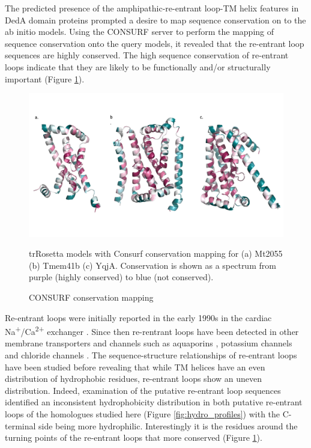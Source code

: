 The predicted presence of the amphipathic-re-entrant loop-TM helix features in DedA domain proteins prompted a desire to map sequence conservation on to the ab initio models. Using the CONSURF server to perform the mapping of sequence conservation onto the query models, it revealed that the re-entrant loop sequences are highly conserved. The high sequence conservation of re-entrant loops indicate that they are likely to be functionally and/or structurally important (Figure \ref{fig:consurf}).

\begin{figure}[th!]
    \centering
    \includegraphics[width=\textwidth]{Results/fig6.png}
    \caption{CONSURF conservation mapping}
    \label{fig:consurf}
    \small
    trRosetta models with Consurf conservation mapping for (a) Mt2055 (b) Tmem41b (c) YqjA. Conservation is shown as a spectrum from purple (highly conserved) to blue (not conserved).
\end{figure}


Re-entrant loops were initially reported in the early 1990s in the cardiac Na\textsuperscript{+}/Ca\textsuperscript{2+} exchanger \cite{iwamoto1999unique}.
Since then re-rentrant loops have been detected in other membrane transporters and channels such as aquaporins \cite{de2001refined}, potassium channels \cite{zhou2001chemistry} and chloride channels \cite{dutzler2002x}.  The sequence-structure relationships of re-entrant loops have been studied before \cite{Yan2010} revealing that while TM helices have an even distribution of hydrophobic residues, re-entrant loops show an uneven distribution. Indeed, examination of the putative re-entrant loop sequences identified an inconsistent hydrophobicity distribution in both putative re-entrant loops of the homologues studied here (Figure \ref{fig:hydro_profiles}) with the C-terminal side being more hydrophilic. Interestingly it is the residues around the turning points of the re-entrant loops that more conserved (Figure \ref{fig:consurf}).  

